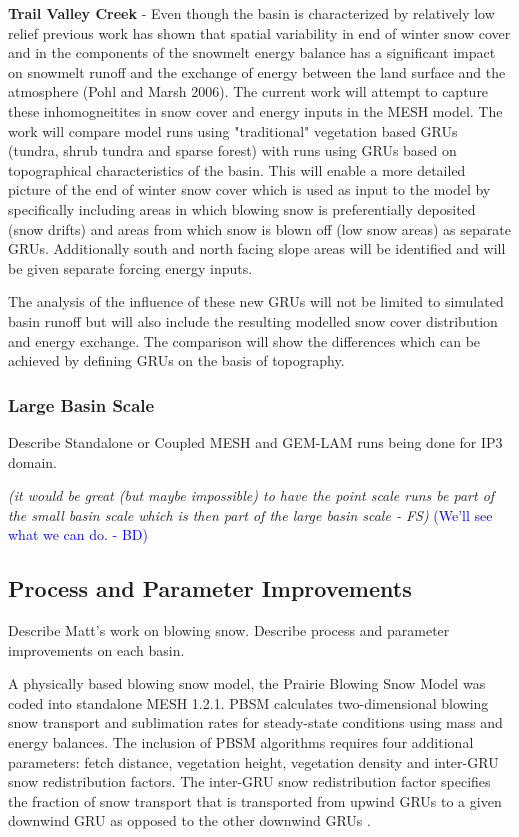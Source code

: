\documentclass[hess]{copernicus}
\begin{document}
\textbf{Trail Valley Creek} - Even though the basin is characterized by relatively low relief previous work has shown that spatial variability in end of winter snow cover and in the components of the snowmelt energy balance has a significant impact on snowmelt runoff and the exchange of energy between the land surface and the atmosphere (Pohl and Marsh 2006). The current work will attempt to capture these inhomogneitites in snow cover and energy inputs in the MESH model. The work will compare model runs using "traditional" vegetation based GRUs (tundra, shrub tundra and sparse forest) with runs using GRUs based on topographical characteristics of the basin. This will enable a more detailed picture of the end of winter snow cover which is used as input to the model by specifically including areas in which blowing snow is preferentially deposited (snow drifts) and areas from which snow is blown off (low snow areas) as separate GRUs. Additionally south and north facing slope areas will be identified and will be given separate forcing energy inputs.

The analysis of the influence of these new GRUs will not be limited to simulated basin runoff but will also include the resulting modelled snow cover distribution and energy exchange. The comparison will show the differences which can be achieved by defining GRUs on the basis of topography.


\subsubsection{Large Basin Scale}
Describe Standalone or Coupled MESH and GEM-LAM runs being done for IP3 domain.

{\em (it would be great (but maybe impossible) to have the point scale runs be part of the small basin scale which is then part of the large basin scale - FS)}\textcolor{blue}{ (We'll see what we can do. - BD) }

\subsection{Process and Parameter Improvements}
Describe Matt's work on blowing snow. Describe process and parameter improvements on each basin.

A physically based blowing snow model, the Prairie Blowing Snow Model \cite[PBSM]{pomeroy_li:2000} was coded into standalone MESH 1.2.1. PBSM calculates two-dimensional blowing snow transport and sublimation rates for steady-state conditions using mass and energy balances. The inclusion of PBSM algorithms requires four additional parameters: fetch distance, vegetation height, vegetation density and inter-GRU snow redistribution factors. The inter-GRU snow redistribution factor specifies the fraction of snow transport that is transported from upwind GRUs to a given downwind GRU as opposed to the other downwind GRUs \citep{macdonald_etal:2009}.
\end{document}
